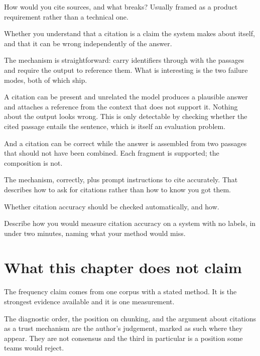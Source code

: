 \begin{bankq}{How would you cite sources, and what breaks?}
\qasked
Usually framed as a product requirement rather than a technical one.

\qtested
Whether you understand that a citation is a claim the system makes about
itself, and that it can be wrong independently of the answer.

\qstaff
The mechanism is straightforward: carry identifiers through with the passages
and require the output to reference them. What is interesting is the two
failure modes, both of which ship.

A citation can be present and unrelated \dash{} the model produces a plausible
answer and attaches a reference from the context that does not support it.
Nothing about the output looks wrong. This is only detectable by checking
whether the cited passage entails the sentence, which is itself an evaluation
problem.

And a citation can be correct while the answer is assembled from two passages
that should not have been combined. Each fragment is supported; the composition
is not.


\qsenior
The mechanism, correctly, plus prompt instructions to cite accurately. That
describes how to ask for citations rather than how to know you got them.

\qcontested
Whether citation accuracy should be checked automatically, and how.

\qdrill
Describe how you would measure citation accuracy on a system with no labels,
in under two minutes, naming what your method would miss.
\end{bankq}

\section*{What this chapter does not claim}

The frequency claim comes from one corpus with a stated method. It is the
strongest evidence available and it is one measurement.

The diagnostic order, the position on chunking, and the argument about
citations as a trust mechanism are the author's judgement, marked as such where
they appear. They are not consensus and the third in particular is a position
some teams would reject.
